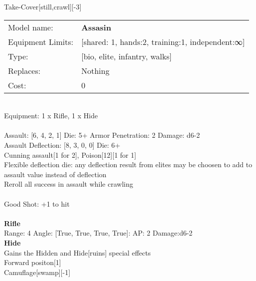 \noindent Take-Cover[still,crawl][-3]\\ 


\noindent
\begin{tabular}{ll}
Model name: &{\bf Assasin } \\
Equipment Limits: &[shared: 1, hands:2, training:1, independent:∞] \\
Type: &[bio, elite, infantry, walks] \\
Replaces: &Nothing \\
Cost: & 0\\
\end{tabular}
\ \\
Equipment: 1 x Rifle, 1 x Hide \\
\ \\
Assault: [6, 4, 2, 1] Die: 5+ Armor Penetration: 2 Damage: d6-2 \\
Assault Deflection: [8, 3, 0, 0] Die: 6+\\
\indent Cunning assault[1 for 2], Poison[12][1 for 1]\\ 
Flexible deflection die: any deflection result from elites may be choosen to add to assault value instead of deflection\\ 
Reroll all success in assault while crawling\\ 
 
\ \\
Good Shot: +1 to hit\\ 

\ \\
{\bf Rifle } \\



Range: 4  Angle: [True, True, True, True]: AP: 2 Damage:d6-2 \\




{\bf Hide } \\

Gains the Hidden and Hide[ruins] special effects\\ 
Forward positon[1]\\ 
Camuflage[swamp][-1]\\ 





 
\ \\



